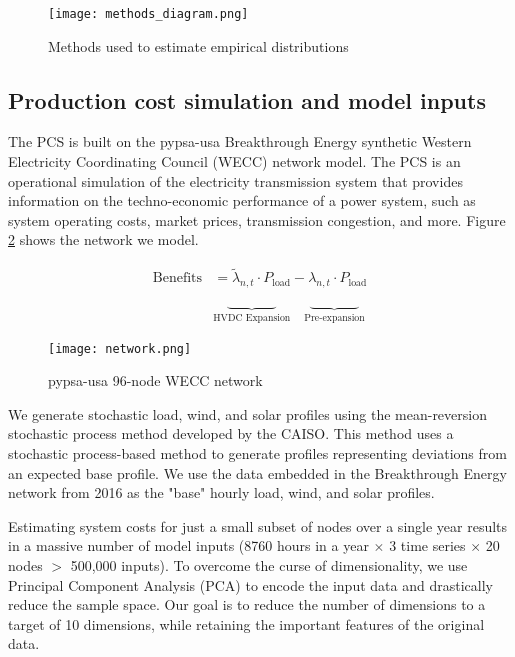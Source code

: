 \documentclass[10pt,twocolumn,letterpaper]{article}
\begin{document}
\begin{figure}[!htbp]
    \centering
    \texttt{[image: methods\_diagram.png]}
    \caption{\label{fig:methods}Methods used to estimate empirical distributions}
\end{figure}

\subsection{Production cost simulation and model inputs}

The PCS is built on the pypsa-usa Breakthrough Energy synthetic Western Electricity Coordinating Council (WECC) network model\cite{xu_us_2020}. The PCS is an operational simulation of the electricity transmission system that provides information on the techno-economic performance of a power system, such as system operating costs, market prices, transmission congestion, and more. Figure \ref{fig:network} shows the network we model.

\begin{align*}
    \text{Benefits} &=  \tilde{\lambda}_{n,t} \cdot P_{\text{load}} - \lambda_{n,t} \cdot P_{\text{load}} \\
    &\underbrace{\phantom{\text{Benefits}}}_{\text{HVDC Expansion}} \hspace{1em} \underbrace{\phantom{\text{Benefits}}}_{\text{Pre-expansion}}
 \end{align*}
    

\begin{figure}[h]
    \centering
    \texttt{[image: network.png]}
    \caption{pypsa-usa 96-node WECC network}
    \label{fig:network}
\end{figure}

We generate stochastic load, wind, and solar profiles using the mean-reversion stochastic process method developed by the CAISO\cite{liu_order_nodate,liu_stochastic_2016}. This method uses a stochastic process-based method to generate profiles representing deviations from an expected base profile. We use the data embedded in the Breakthrough Energy network from 2016 as the "base" hourly load, wind, and solar profiles.

Estimating system costs for just a small subset of nodes over a single year results in a massive number of model inputs (8760 hours in a year $\times$ 3 time series $\times$ 20 nodes $>$ 500,000 inputs). To overcome the curse of dimensionality, we use Principal Component Analysis (PCA) to encode the input data and drastically reduce the sample space. Our goal is to reduce the number of dimensions to a target of 10 dimensions, while retaining the important features of the original data. 
\end{document}
